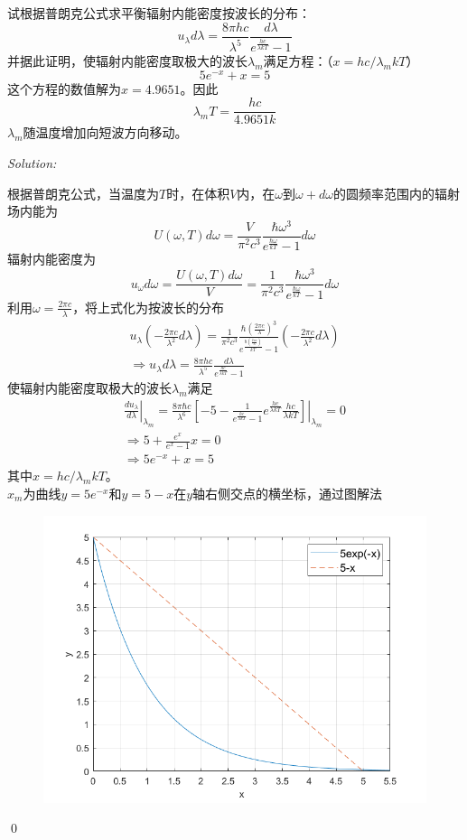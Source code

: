 \documentclass[12pt,a4paper]{article}
\newenvironment{problem}[2][Problem]{\begin{trivlist}
\item[\hskip \labelsep {\bfseries #1}\hskip \labelsep {\bfseries #2.}]}{\end{trivlist}}
\newenvironment{sol}
    {\emph{Solution:}
    }
    {
    \qed
    }
\begin{document}
\begin{problem}{8.8}
试根据普朗克公式求平衡辐射内能密度按波长的分布：
\[
u_{\lambda}d\lambda=\frac{8\pi hc}{\lambda^5}\frac{d\lambda}{e^{\frac{hc}{\lambda kT}}-1}
\]
并据此证明，使辐射内能密度取极大的波长$\lambda_m$满足方程：（$x=hc/\lambda_mkT$）
\[
5e^{-x}+x=5
\]
这个方程的数值解为$x=4.9651$。因此
\[
\lambda_mT=\frac{hc}{4.9651k}
\]
$\lambda_m$随温度增加向短波方向移动。
\end{problem}
\begin{sol}
根据普朗克公式，当温度为$T$时，在体积$V$内，在$\omega$到$\omega+d\omega$的圆频率范围内的辐射场内能为
\begin{equation}
U(\omega,T)d\omega=\frac{V}{\pi^2c^3}\frac{\hbar\omega^3}{e^{\frac{\hbar\omega}{kT}}-1}d\omega
\end{equation}
辐射内能密度为
\begin{equation}
u_{\omega}d\omega=\frac{U(\omega,T)d\omega}{V}=\frac{1}{\pi^2c^3}\frac{\hbar\omega^3}{e^{\frac{\hbar\omega}{kT}}-1}d\omega
\end{equation}
利用$\omega=\frac{2\pi c}{\lambda}$，将上式化为按波长的分布
\begin{gather}
u_{\lambda}\left(-\frac{2\pi c}{\lambda^2}d\lambda\right)=\frac{1}{\pi^2c^3}\frac{\hbar\left(\frac{2\pi c}{\lambda}\right)^3}{e^{\frac{\hbar\left(\frac{2\pi c}{\lambda}\right)}{kT}}-1}\left(-\frac{2\pi c}{\lambda^2}d\lambda\right)\\
\Longrightarrow u_{\lambda}d\lambda=\frac{8\pi hc}{\lambda^5}\frac{d\lambda}{e^{\frac{hc}{\lambda kT}}-1}
\end{gather}
使辐射内能密度取极大的波长$\lambda_m$满足
\begin{gather}
\left.\frac{du_{\lambda}}{d\lambda}\right|_{\lambda_m}=\left.\frac{8\pi\hbar c}{\lambda^6}\left[-5-\frac{1}{e^{\frac{hc}{\lambda kT}}-1}e^{\frac{hc}{\lambda kT}}\frac{hc}{\lambda kT}\right]\right|_{\lambda_m}=0\\
\Longrightarrow5+\frac{e^x}{e^x-1}x=0\\
\Longrightarrow5e^{-x}+x=5
\end{gather}
其中$x=hc/\lambda_mkT$。\\
$x_m$为曲线$y=5e^{-x}$和$y=5-x$在$y$轴右侧交点的横坐标，通过图解法
\begin{figure}[h]
\centering
\includegraphics[scale=.5]{fig8-8.png}

\end{figure}
\end{sol}
\end{document}
